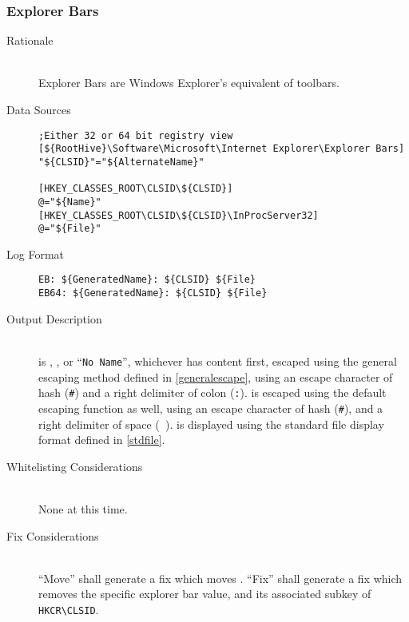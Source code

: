 \subsubsection{Explorer Bars}
\begin{description}
\item[Rationale] \hfill \\
Explorer Bars are Windows Explorer's equivalent of toolbars.
\item[Data Sources] \hfill
\vspace{-\baselineskip}
\begin{verbatim}
;Either 32 or 64 bit registry view
[${RootHive}\Software\Microsoft\Internet Explorer\Explorer Bars]
"${CLSID}"="${AlternateName}"

[HKEY_CLASSES_ROOT\CLSID\${CLSID}]
@="${Name}"
[HKEY_CLASSES_ROOT\CLSID\${CLSID}\InProcServer32]
@="${File}"
\end{verbatim}
\item[Log Format] \hfill
\vspace{-\baselineskip}
\begin{verbatim}
EB: ${GeneratedName}: ${CLSID} ${File}
EB64: ${GeneratedName}: ${CLSID} ${File}
\end{verbatim}
\item[Output Description] \hfill \\
 is , , or ``\verb|No Name|'',
whichever has content first, escaped using the general escaping method defined
in \ref{generalescape}, using an escape character of hash (\verb|#|) and a right
delimiter of colon (\verb|:|).  is escaped using the default escaping
function as well, using an escape character of hash (\verb|#|), and a right
delimiter of space (\verb| |).  is displayed using the standard file
display format defined in \ref{stdfile}.
\item[Whitelisting Considerations] \hfill \\
None at this time.
\item[Fix Considerations] \hfill \\
``Move'' shall generate a fix which moves . ``Fix'' shall generate a
fix which removes the specific explorer bar value, and its associated subkey of
\verb|HKCR\CLSID|.
\end{description}

